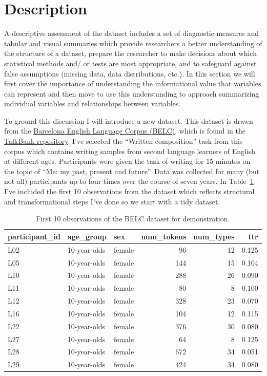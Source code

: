 \documentclass[
  letterpaper,
]{latex/krantz}
\begin{document}
\hypertarget{description}{%
\section{Description}\label{description}}

A descriptive assessment of the dataset includes a set of diagnostic
measures and tabular and visual summaries which provide researchers a
better understanding of the structure of a dataset, prepare the
researcher to make decisions about which statistical methods and/ or
tests are most appropriate, and to safeguard against false assumptions
(missing data, data distributions, etc.). In this section we will first
cover the importance of understanding the informational value that
variables can represent and then move to use this understanding to
approach summarizing individual variables and relationships between
variables.

To ground this discussion I will introduce a new dataset. This dataset
is drawn from the
\href{https://slabank.talkbank.org/access/English/BELC.html}{Barcelona
English Language Corpus (BELC)}, which is found in the
\href{http://talkbank.org/}{TalkBank repository}. I've selected the
``Written composition'' task from this corpus which contains writing
samples from second language learners of English at different ages.
Participants were given the task of writing for 15 minutes on the topic
of ``Me: my past, present and future''. Data was collected for many (but
not all) participants up to four times over the course of seven years.
In Table~\ref{tbl-belc-overview} I've included the first 10 observations
from the dataset which reflects structural and transformational steps
I've done so we start with a tidy dataset.

\hypertarget{tbl-belc-overview}{}
\begin{table}
\caption{\label{tbl-belc-overview}First 10 observations of the BELC dataset for demonstration. }\tabularnewline

\centering
\begin{tabular}{l|l|l|r|r|r}
\hline
participant\_id & age\_group & sex & num\_tokens & num\_types & ttr\\
\hline
L02 & 10-year-olds & female & 96 & 12 & 0.125\\
\hline
L05 & 10-year-olds & female & 144 & 15 & 0.104\\
\hline
L10 & 10-year-olds & female & 288 & 26 & 0.090\\
\hline
L11 & 10-year-olds & female & 80 & 8 & 0.100\\
\hline
L12 & 10-year-olds & female & 328 & 23 & 0.070\\
\hline
L16 & 10-year-olds & female & 104 & 12 & 0.115\\
\hline
L22 & 10-year-olds & female & 376 & 30 & 0.080\\
\hline
L27 & 10-year-olds & female & 64 & 8 & 0.125\\
\hline
L28 & 10-year-olds & female & 672 & 34 & 0.051\\
\hline
L29 & 10-year-olds & female & 424 & 34 & 0.080\\
\hline
\end{tabular}
\end{table}
\end{document}
